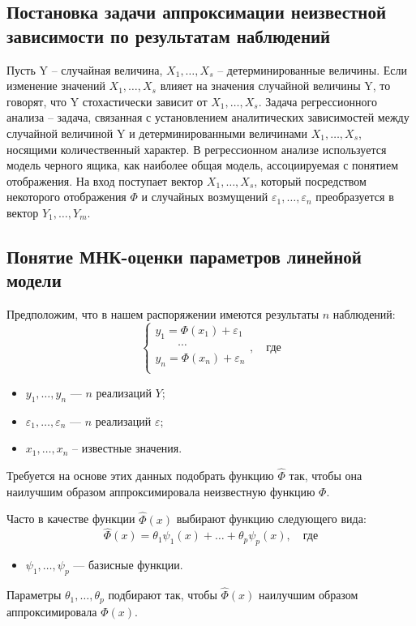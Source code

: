 \documentclass[a4paper, 12pt]{article}
\theoremstyle{definition}
\begin{document}
\subsection{Постановка задачи аппроксимации неизвестной зависимости по результатам наблюдений}

Пусть Y – случайная величина, $X_1, \dots, X_s$ – детерминированные величины. Если изменение значений $X_1, \dots, X_s$ влияет на значения случайной величины Y, то говорят, что Y стохастически зависит от $X_1, \dots, X_s$. Задача регрессионного анализа – задача, связанная с установлением аналитических зависимостей между случайной величиной Y и детерминированными величинами $X_1, \dots, X_s$, носящими количественный характер. 
В регрессионном анализе используется модель черного ящика, как наиболее общая модель, ассоциируемая с понятием отображения. На вход поступает вектор $X_1, \dots, X_s$, который посредством некоторого отображения $\Phi$ и случайных возмущений $\varepsilon_1, \dots, \varepsilon_n$ преобразуется в вектор $Y_1, \dots, Y_m$.

\subsection{Понятие МНК-оценки параметров линейной модели}

Предположим, что в нашем распоряжении имеются результаты $n$ наблюдений:
\begin{equation}
\begin{cases}
y_1 = \Phi(x_1) + \varepsilon_1 \\
\qquad\cdots                    \\
y_n = \Phi(x_n) + \varepsilon_n \\
\end{cases}, \quad \text{где}
\end{equation}
\begin{itemize}
	\item $y_1, \dots, y_n$ --- $n$ реализаций $Y$;
	\item $\varepsilon_1, \dots, \varepsilon_n$ --- $n$ реализаций $\varepsilon$;
	\item $x_1, \dots, x_n$ -- известные значения.
\end{itemize}
Требуется на основе этих данных подобрать функцию $\widehat{\Phi}$ так, чтобы она наилучшим образом аппроксимировала неизвестную функцию $\Phi$.


Часто в качестве функции $\widehat{\Phi}(x)$ выбирают функцию следующего вида:
\begin{equation}
\widehat{\Phi}(x) = \theta_1 \psi_1(x) + \dots + \theta_p \psi_p(x), \quad \text{где}
\end{equation}
\begin{itemize}
	\item $\psi_1, \dots, \psi_p$ --- базисные функции.
\end{itemize}
Параметры $\theta_1, \dots, \theta_p$ подбирают так, чтобы $\widehat{\Phi}(x)$ наилучшим образом аппроксимировала $\Phi(x)$.
\end{document}
